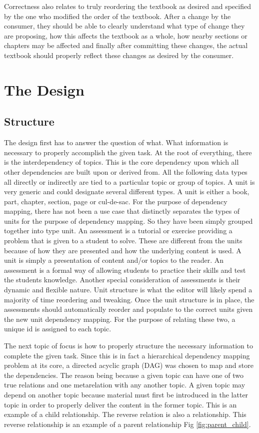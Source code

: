 Correctness also relates to truly reordering the textbook as desired and specified by the one who modified the order of the textbook. After a change by the consumer, they should be able to clearly understand what type of change they are proposing, how this affects the textbook as a whole, how nearby sections or chapters may be affected and finally after committing these changes, the actual textbook should properly reflect these changes as desired by the consumer. 

\section{The Design}

\subsection{Structure}

The design first has to answer the question of what. What information is necessary  to properly accomplish the given task. At the root of everything, there is the interdependency of topics. This is the core dependency upon which all other dependencies are built upon or derived from. All the following data types all directly or indirectly are tied to a particular topic or group of topics. A unit is very generic and could designate several different types. A unit is either a book, part, chapter, section, page or cul-de-sac. For the purpose of dependency mapping, there has not been a use case that distinctly separates the types of units for the purpose of dependency mapping. So they have been simply grouped together into type unit. An assessment is a tutorial or exercise providing a problem that is given to a student to solve. These are different from the units because of how they are presented and how the underlying content is used. A unit is simply a presentation of content and/or topics to the reader. An assessment is a formal way of allowing students to practice their skills and test the students knowledge. Another special consideration of assessments is their dynamic and flexible nature. Unit structure is what the editor will likely spend a majority of time reordering and tweaking. Once the unit structure is in place, the assessments should automatically reorder and populate to the correct units given the new unit dependency mapping. For the purpose of relating these two, a unique id is assigned to each topic.

The next topic of focus is how to properly structure the necessary information to complete the given task. Since this is in fact a hierarchical dependency mapping problem at its core, a directed acyclic graph (DAG) was chosen to map and store the dependencies. The reason being because a given topic can have one of two true relations and one metarelation with any another topic. A given topic may depend on another topic because material must first be introduced in the latter topic in order to properly deliver the content in the former topic. This is an example of a child relationship. The reverse relation is also a relationship. This reverse relationship is an example of a parent relationship Fig \ref{fig:parent_child}.

